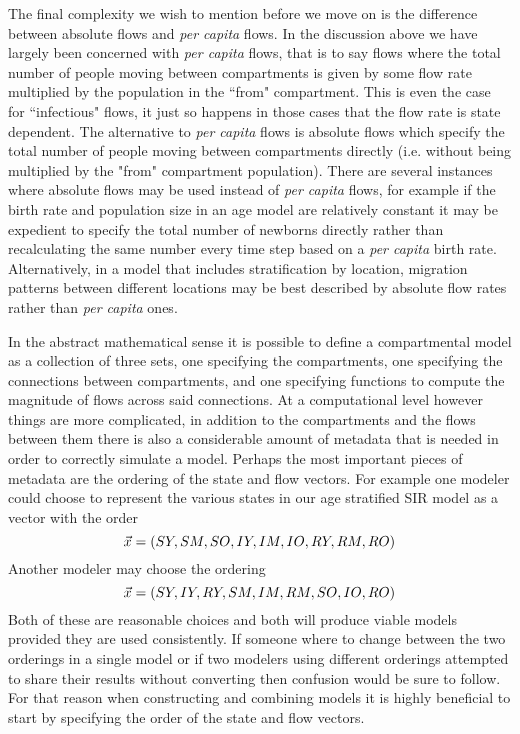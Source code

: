 The final complexity we wish to mention before we move on is the difference between absolute flows and \emph{per capita} flows. In the discussion above we have largely been concerned with \emph{per capita} flows, that is to say flows where the total number of people moving between compartments is given by some flow rate multiplied by the population in the ``from" compartment. This is even the case for ``infectious" flows, it just so happens in those cases that the flow rate is state dependent. The alternative to \emph{per capita} flows is absolute flows which specify the total number of people moving between compartments directly (i.e. without being multiplied by the "from" compartment population). There are several instances where absolute flows may be used instead of \emph{per capita} flows, for example if the birth rate and population size in an age model are relatively constant it may be expedient to specify the total number of newborns directly rather than recalculating the same number every time step based on a \emph{per capita} birth rate. Alternatively, in a model that includes stratification by location, migration patterns between different locations may be best described by absolute flow rates rather than \emph{per capita} ones.

In the abstract mathematical sense it is possible to define a compartmental model as a collection of three sets, one specifying the compartments, one specifying the connections between compartments, and one specifying functions to compute the magnitude of flows across said connections. At a computational level however things are more complicated, in addition to the compartments and the flows between them there is also a considerable amount of metadata that is needed in order to correctly simulate a model. Perhaps the most important pieces of metadata are the ordering of the state and flow vectors. For example one modeler could choose to represent the various states in our age stratified SIR model as a vector with the order 
\[
    \vec{x} = (SY, SM, SO, IY, IM, IO, RY, RM, RO)
\]
Another modeler may choose the ordering
\[
    \vec{x} = (SY, IY, RY, SM, IM, RM, SO, IO, RO)
\]
Both of these are reasonable choices and both will produce viable models provided they are used consistently. If someone where to change between the two orderings in a single model or if two modelers using different orderings attempted to share their results without converting then confusion would be sure to follow. For that reason when constructing and combining models it is highly beneficial to start by specifying the order of the state and flow vectors. 


